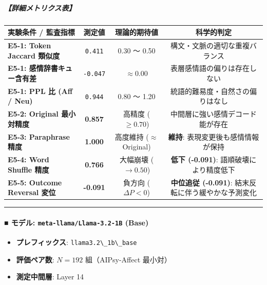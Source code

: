 \subparagraph{【詳細メトリクス表】}
\begin{center}
\small
\begin{tabular}{lccc}
\toprule
\textbf{実験条件 / 監査指標} & \textbf{測定値} & \textbf{理論的期待値} & \textbf{科学的判定} \\
\midrule
\textbf{E5-1: Token Jaccard 類似度} & \texttt{0.411} & 0.30 〜 0.50 & 構文・文脈の適切な重複バランス \\
\textbf{E5-1: 感情辞書キュー含有差} & \texttt{-0.047} & $\approx 0.00$ & 表層感情語の偏りは存在しない \\
\textbf{E5-1: PPL 比 (Aff / Neu)} & \texttt{0.944} & 0.80 〜 1.20 & 統語的難易度・自然さの偏りはなし \\
\textbf{E5-2: Original 最小対精度} & \textbf{0.857} & 高精度 ($\ge 0.70$) & 中間層に強い感情デコード能が存在 \\
\textbf{E5-3: Paraphrase 精度} & \textbf{1.000} & 高度維持 ($\approx$ Original) & \textbf{維持}: 表現変更後も感情情報が保持 \\
\textbf{E5-4: Word Shuffle 精度} & \textbf{0.766} & 大幅崩壊 ($\rightarrow 0.50$) & \textbf{低下 (-0.091)}: 語順破壊により精度低下 \\
\textbf{E5-5: Outcome Reversal 変位} & \textbf{-0.091} & 負方向 ($\Delta P < 0$) & \textbf{中位追従 (-0.091)}: 結末反転に伴う緩やかな予測変化 \\
\bottomrule
\end{tabular}
\end{center}


\vspace{0.5em}\hrule\vspace{0.5em}

\paragraph{■ モデル: \texttt{meta-llama/Llama-3.2-1B} (Base)}
\begin{itemize}
\item \textbf{プレフィックス}: \texttt{llama3.2\textbackslash{}\_1b\textbackslash{}\_base}
\item \textbf{評価ペア数}: $N=192$ 組（AIPsy-Affect 最小対）
\item \textbf{測定中間層}: Layer 14
\end{itemize}

